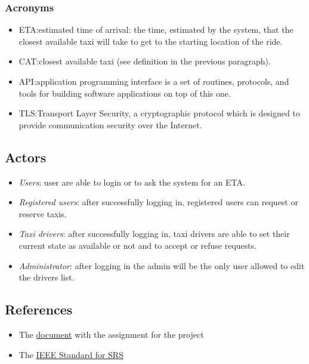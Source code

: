 \documentclass{article}
\begin{document}
\subsubsection{Acronyms}
\begin{itemize}
	\item ETA:\@ estimated time of arrival: the time, estimated by the system, that the closest available taxi will take to get to the starting location of the ride.
	\item CAT:\@ closest available taxi (see definition in the previous paragraph).
	\item API:\@ application programming interface is a set of routines, protocols, and tools for building software applications on top of this one.
	\item TLS:\@ Transport Layer Security, a cryptographic protocol which is designed to provide communication security over the Internet.
\end{itemize}
\subsection{Actors}
\begin{itemize}
	\item \textit{Users}: user are able to login or to ask the system for an ETA.\@
	\item \textit{Registered users}: after successfully logging in, registered users can request or reserve taxis.
	\item \textit{Taxi drivers}: after successfully logging in, taxi drivers are able to set their current state as available or not and to accept or refuse requests.
	\item \textit{Administrator}: after logging in the admin will be the only user allowed to edit the drivers list.
\end{itemize}

\subsection{References}
\begin{itemize}
	\item The \href{run:./external_references/assignments.pdf}{document} with the assignment for the project
	\item The \href{run:./external_references/assignments.pdf}{IEEE Standard for SRS } 
\end{itemize}
\end{document}
